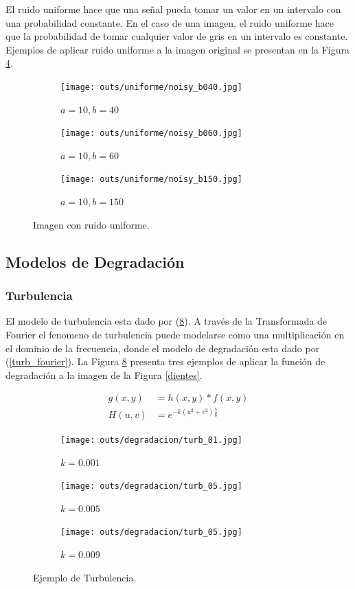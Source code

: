 \documentclass[
  letterpaper,
  twocolumn,
  9pt,
  journal,
  final]{IEEEtran}
\begin{document}
El ruido uniforme hace que una señal pueda tomar un valor en un intervalo con una probabilidad constante. En el caso de una imagen, el ruido uniforme hace que la probabilidad de tomar cualquier valor de gris en un intervalo es constante. Ejemplos de aplicar ruido uniforme a la imagen original se presentan en la Figura \ref{uniforme}.

\begin{figure}[!tbh]
  \centering
  \begin{subfigure}[b]{.32\linewidth}
    \texttt{[image: outs/uniforme/noisy\_b040.jpg]}
    \caption{$a=10, b=40$}\label{uni1}
  \end{subfigure}
  \begin{subfigure}[b]{.32\linewidth}
    \texttt{[image: outs/uniforme/noisy\_b060.jpg]}
    \caption{$a=10, b=60$}\label{uni1}
  \end{subfigure}
  \begin{subfigure}[b]{.32\linewidth}
    \texttt{[image: outs/uniforme/noisy\_b150.jpg]}
    \caption{$a=10, b=150$}\label{uni1}
  \end{subfigure}
  \caption{Imagen con ruido uniforme.}
  \label{uniforme}
\end{figure}

\subsection{Modelos de Degradación}

\subsubsection{Turbulencia}

El modelo de turbulencia esta dado por (\ref{turb}). A través de la Transformada de Fourier el fenomeno de turbulencia puede modelarse como una multiplicación en el dominio de la frecuencia, donde el modelo de degradación esta dado por (\ref{turb_fourier}). La Figura \ref{turb} presenta tres ejemplos de aplicar la función de degradación a la imagen de la Figura \ref{dientes}.

\begin{align}
  g(x, y) &= h(x,y) * f(x,y) \label{turb} \\
  H(u,v) &= e ^ {-k (u^2 + v^2) \frac{5}{6}} \label{turb_fourier}
\end{align}

\begin{figure}[!tbh]
  \centering
  \begin{subfigure}[b]{.32\linewidth}
    \texttt{[image: outs/degradacion/turb\_01.jpg]}
    \caption{$k=0.001$}\label{turb1}
  \end{subfigure}
  \begin{subfigure}[b]{.32\linewidth}
    \texttt{[image: outs/degradacion/turb\_05.jpg]}
    \caption{$k=0.005$}\label{turb5}
  \end{subfigure}
  \begin{subfigure}[b]{.32\linewidth}
    \texttt{[image: outs/degradacion/turb\_05.jpg]}
    \caption{$k=0.009$}\label{turb9}
  \end{subfigure}
  \caption{Ejemplo de Turbulencia.}
  \label{turb}
\end{figure}
\end{document}
